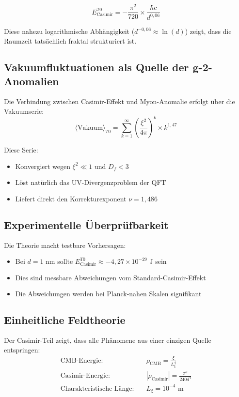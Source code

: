 \documentclass[12pt,a4paper]{article}
\begin{document}
		\begin{equation}
			E_{\text{Casimir}}^{T0} = -\frac{\pi^2}{720} \times \frac{\hbar c}{d^{0{,}06}}
		\end{equation}
		
		Diese nahezu logarithmische Abh\"angigkeit ($d^{-0{,}06} \approx \ln(d)$) zeigt, dass die Raumzeit tats\"achlich fraktal strukturiert ist.
		
		\subsection{Vakuumfluktuationen als Quelle der g-2-Anomalien}
		
		Die Verbindung zwischen Casimir-Effekt und Myon-Anomalie erfolgt \"uber die Vakuumserie:
		\begin{equation}
			\langle \text{Vakuum} \rangle_{T0} = \sum_{k=1}^{\infty} \left(\frac{\xi^2}{4\pi}\right)^k \times k^{1{,}47}
		\end{equation}
		
		Diese Serie:
		\begin{itemize}
			\item Konvergiert wegen $\xi^2 \ll 1$ und $D_f < 3$
			\item L\"ost nat\"urlich das UV-Divergenzproblem der QFT
			\item Liefert direkt den Korrekturexponent $\nu = 1{,}486$
		\end{itemize}
		
		\subsection{Experimentelle \"Uberpr\"ufbarkeit}
		
		Die Theorie macht testbare Vorhersagen:
		\begin{itemize}
			\item Bei $d = 1$ nm sollte $E_{\text{Casimir}}^{T0} \approx -4{,}27 \times 10^{-29}$ J sein
			\item Dies sind messbare Abweichungen vom Standard-Casimir-Effekt
			\item Die Abweichungen werden bei Planck-nahen Skalen signifikant
		\end{itemize}
		
		\subsection{Einheitliche Feldtheorie}
		
		Der Casimir-Teil zeigt, dass alle Ph\"anomene aus einer einzigen Quelle entspringen:
		\begin{align}
			\text{CMB-Energie:} \quad &\rho_{\text{CMB}} = \frac{\xi}{L_\xi^4} \\
			\text{Casimir-Energie:} \quad &|\rho_{\text{Casimir}}| = \frac{\pi^2}{240d^4} \\
			\text{Charakteristische L\"ange:} \quad &L_\xi = 10^{-4} \text{ m}
		\end{align}
		
\end{document}
